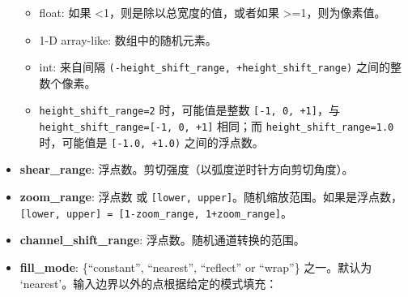 \begin{itemize}
  \begin{itemize}
  \tightlist
  \item
    float: 如果 \textless{}1，则是除以总宽度的值，或者如果
    \textgreater{}=1，则为像素值。
  \item
    1-D array-like: 数组中的随机元素。
  \item
    int: 来自间隔
    \texttt{(-height\_shift\_range,\ +height\_shift\_range)}
    之间的整数个像素。
  \item
    \texttt{height\_shift\_range=2} 时，可能值是整数
    \texttt{{[}-1,\ 0,\ +1{]}}，与
    \texttt{height\_shift\_range={[}-1,\ 0,\ +1{]}} 相同；而
    \texttt{height\_shift\_range=1.0} 时，可能值是
    \texttt{{[}-1.0,\ +1.0)} 之间的浮点数。
  \end{itemize}
\item
  \textbf{shear\_range}: 浮点数。剪切强度（以弧度逆时针方向剪切角度）。
\item
  \textbf{zoom\_range}: 浮点数 或
  \texttt{{[}lower,\ upper{]}}。随机缩放范围。如果是浮点数，\texttt{{[}lower,\ upper{]}\ =\ {[}1-zoom\_range,\ 1+zoom\_range{]}}。
\item
  \textbf{channel\_shift\_range}: 浮点数。随机通道转换的范围。
\item
  \textbf{fill\_mode}: \{``constant'', ``nearest'', ``reflect'' or
  ``wrap''\} 之一。默认为
  `nearest'。输入边界以外的点根据给定的模式填充：


\end{itemize}

